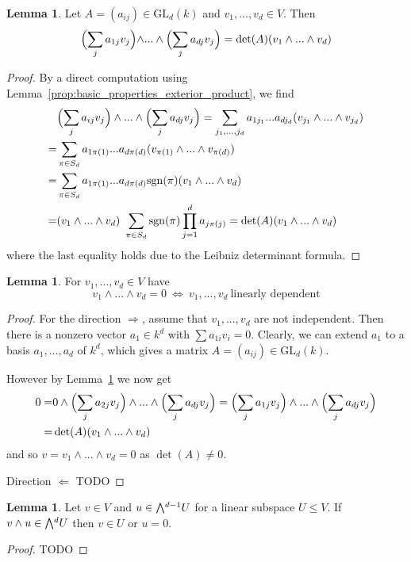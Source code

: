 \documentclass{scrartcl}
\newcommand{\GL}{\mathrm{GL}}
\newcommand{\sgn}{\mathrm{sgn}}
\newcommand{\extpow}{\mathchoice{{\textstyle\bigwedge}}
    {{\bigwedge}}
    {{\textstyle\wedge}}
    {{\scriptstyle\wedge}}}
\theoremstyle{definition}
\newtheorem{lemma}[definition]{Lemma}
\begin{document}
\begin{lemma}
    \label{prop:linear_transform_extpow}
    Let $A = (a_{ij}) \in \GL_d(k)$ and $v_1, ..., v_d \in V$.
    Then
    \begin{equation*}
        \Bigl( \sum_j a_{1j}v_j \Bigl) \wedge ... \wedge \Bigl( \sum_{j} a_{dj} v_j \Bigr) = \det(A) (v_1 \wedge ... \wedge v_d)
    \end{equation*}
\end{lemma}
\begin{proof}
    By a direct computation using Lemma~\ref{prop:basic_properties_exterior_product}, we find
    \begin{align*}
        &\Bigl( \sum_j a_{ij} v_j \Bigr) \wedge ... \wedge \Bigl( \sum_j a_{dj} v_j \Bigr) = \sum_{j_1, ..., j_d} a_{1j_1} ... a_{dj_d} (v_{j_1} \wedge ... \wedge v_{j_d}) \\
        = &\sum_{\pi \in S_d} a_{1\pi(1)} ... a_{d\pi(d)} (v_{\pi(1)} \wedge ... \wedge v_{\pi(d)}) \\
        = &\sum_{\pi \in S_d} a_{1\pi(1)} ... a_{d\pi(d)} \sgn(\pi) (v_1 \wedge ... \wedge v_d) \\
        = &(v_1 \wedge ... \wedge v_d) \ \sum_{\pi \in S_d} \sgn(\pi) \prod_{j = 1}^d a_{j\pi(j)} = \det(A) (v_1 \wedge ... \wedge v_d)
    \end{align*}
    where the last equality holds due to the Leibniz determinant formula.
\end{proof}
\begin{lemma}
    \label{prop:extpow_zero_iff_independent}
    For $v_1, ..., v_d \in V$ have
    \begin{equation*}
        v_1 \wedge ... \wedge v_d = 0 \ \Leftrightarrow \ v_1, ..., v_d \ \text{linearly dependent}
    \end{equation*}
\end{lemma}
\begin{proof}
    For the direction $\Rightarrow$, assume that $v_1, ..., v_d$ are not independent. 
    Then there is a nonzero vector $a_1 \in k^d$ with $\sum a_{1i} v_i = 0$.
    Clearly, we can extend $a_1$ to a basis $a_1, ..., a_d$ of $k^d$, which gives a matrix $A = (a_{ij}) \in \GL_d(k)$.

    However by Lemma~\ref{prop:linear_transform_extpow} we now get
    \begin{align*}
        0 =& 0 \wedge \Bigl( \sum_j a_{2j} v_j \Bigr) \wedge ... \wedge \Bigl( \sum_j a_{dj} v_j \Bigr) = \Bigl( \sum_j a_{1j} v_j \Bigr) \wedge ... \wedge \Bigl( \sum_j a_{dj} v_j \Bigr) \\
        =& \det(A) (v_1 \wedge ... \wedge v_d)
    \end{align*}
    and so $v = v_1 \wedge ... \wedge v_d = 0$ as $\det(A) \neq 0$.

    Direction $\Leftarrow$ TODO
\end{proof}
\begin{lemma}
    \label{prop:subspace_closed}
    Let $v \in V$ and $u \in \extpow^{d - 1} U$ for a linear subspace $U \leq V$. 
    If $v \wedge u \in \extpow^d U$ then $v \in U$ or $u = 0$.
\end{lemma}
\begin{proof}
    TODO
\end{proof}
\end{document}
